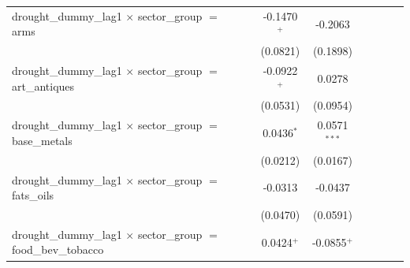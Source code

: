 \begin{tabular}{lcccccccc}
   drought\_dummy\_lag1 $\times$ sector\_group $=$ arms                           &                       &                       & -0.1470$^{+}$         & -0.2063               &                       &                       &                       &   \\   
                                                                                  &                       &                       & (0.0821)              & (0.1898)              &                       &                       &                       &   \\   
   drought\_dummy\_lag1 $\times$ sector\_group $=$ art\_antiques                  &                       &                       & -0.0922$^{+}$         & 0.0278                &                       &                       &                       &   \\   
                                                                                  &                       &                       & (0.0531)              & (0.0954)              &                       &                       &                       &   \\   
   drought\_dummy\_lag1 $\times$ sector\_group $=$ base\_metals                   &                       &                       & 0.0436$^{*}$          & 0.0571$^{***}$        &                       &                       &                       &   \\   
                                                                                  &                       &                       & (0.0212)              & (0.0167)              &                       &                       &                       &   \\   
   drought\_dummy\_lag1 $\times$ sector\_group $=$ fats\_oils                     &                       &                       & -0.0313               & -0.0437               &                       &                       &                       &   \\   
                                                                                  &                       &                       & (0.0470)              & (0.0591)              &                       &                       &                       &   \\   
   drought\_dummy\_lag1 $\times$ sector\_group $=$ food\_bev\_tobacco             &                       &                       & 0.0424$^{+}$          & -0.0855$^{+}$         &                       &                       &                       &   \\   

\end{tabular}
